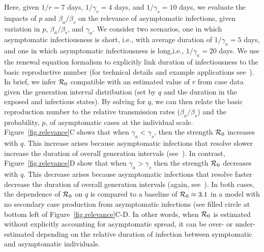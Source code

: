 Here, given $1/r=7$ days, $1/\gamma_e=4$ days, and
$1/\gamma_s=10$ days, we evaluate the impacts of $p$ and $\beta_a/\beta_s$ on the
relevance of asymptomatic infections, given variation in 
$p$, $\beta_a/\beta_s$, and $\gamma_a$.  We consider two
scenarios, one in which asymptomatic infectiousness is short, i.e., with
average duration of $1/\gamma_a=5$ days,
and one in which asymptomatic infectiousness is long,i.e., $1/\gamma_a=20$ days.
We use the renewal equation formalism to explicitly link duration of infectiousness to the 
basic reproductive number (for technical details and example 
applications see~\citep{wallinga2007generation,weitz_scirep2015,champredon_2018}).
In brief, we
infer ${\cal{R}}_0$ compatible with an estimated value of $r$ from case
data given the generation interval distribution 
(set by $q$ and the duration in the exposed and infectious states).
By solving for $q$, we can then relate the basic
reproduction number to the relative transmission rates ($\beta_a/\beta_s$)
and the probability, $p$, of asymptomatic cases at the individual scale.
Figure~\ref{fig.relevance}C shows that
when $\gamma_a<\gamma_s$, then the strength ${\cal{R}}_0$ increases
with $q$. 
This increase arises because asymptomatic infections that resolve
slower increase the duration of
overall generation intervals (see~\citep{park_2019practical}). In contrast,
Figure~\ref{fig.relevance}D show that
when $\gamma_a>\gamma_s$ then
the strength ${\cal{R}}_0$ decreases with $q$.  
This decrease arises because asymptomatic infections that resolve
faster decrease the duration of
overall generation intervals (again, see~\citep{park_2019practical}). In both 
cases, the dependence of ${\cal{R}}_0$ on $q$ is
compared to a baseline of 
${\cal{R}}_0\approx 3.1$ in a model with no secondary
case production from asymptomatic infections (see filled
circle at bottom left of Figure~\ref{fig.relevance}C-D.
In other words, when ${\cal{R}}_0$ is estimated without explicitly accounting for asymptomatic spread, it can be over- or under- estimated depending on the relative duration of infection between symptomatic and asymptomatic individuals.

